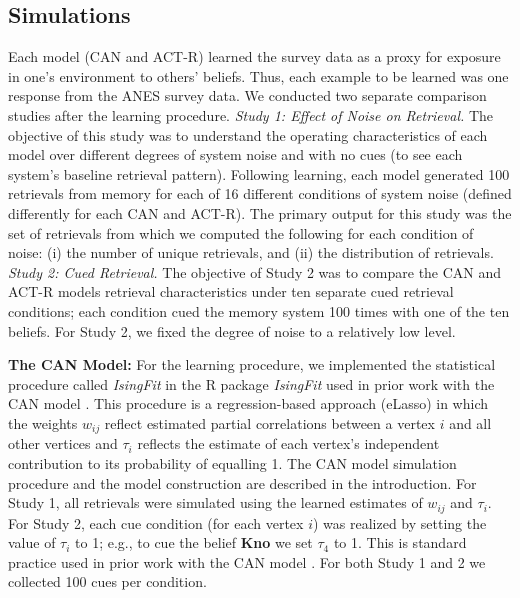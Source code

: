 \documentclass[10pt,letterpaper]{article}
\begin{document}
\subsection{Simulations}\label{sims}
Each model (CAN and ACT-R) learned the survey data as a proxy for exposure in one's environment to others' beliefs.  Thus, each example to be learned was one response from the ANES survey data. We conducted two separate comparison studies after the learning procedure.  \textit{Study 1: Effect of Noise on Retrieval.}  The objective of this study was to understand the operating characteristics of each model over different degrees of system noise and with no cues (to see each system's baseline retrieval pattern).  Following learning, each model generated 100 retrievals from memory for each of 16 different conditions of system noise (defined differently for each CAN and ACT-R).  The primary output for this study was the set of retrievals from which we computed the following for each condition of noise:  (i) the number of unique retrievals, and (ii) the distribution of retrievals. \textit{Study 2: Cued Retrieval.} The objective of Study 2 was to compare the CAN and ACT-R models retrieval characteristics under ten separate cued retrieval conditions; each condition cued the memory system 100 times with one of the ten beliefs.  For Study 2, we fixed the degree of noise to a relatively low level.

\noindent
\textbf{The CAN Model:} For the learning procedure, we implemented the statistical procedure called \textit{IsingFit} in the R package \textit{IsingFit} \citep{vanBorkulo2015} used in prior work with the CAN model \citep{dalege2016,DalegeMaas2017}.  This procedure is a regression-based approach (eLasso) in which the weights $w_{ij}$ reflect estimated partial correlations between a vertex $i$ and all other vertices and $\tau_i$ reflects the estimate of each vertex's independent contribution to its probability of equalling 1.  
The CAN model simulation procedure and the model construction are described in the introduction.  For Study 1, all retrievals were simulated using the learned estimates of $w_{ij}$ and $\tau_i$.  For Study 2, each cue condition (for each vertex $i$) was realized by setting the value of $\tau_i$ to 1; e.g., to cue the belief \textbf{Kno} we set $\tau_4$ to 1.  This is standard practice used in prior work with the CAN model \citep{dalege2016,DalegeMaas2017,DalegevanderMaas2020}. For both Study 1 and 2 we collected 100 cues per condition. 
\end{document}
